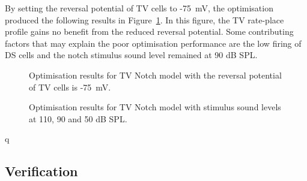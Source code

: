 By setting the reversal potential of TV cells to -75~mV, the optimisation
produced the following results in Figure~\ref{fig:TV_resultErev75}. In this
figure, the TV rate-place profile gains no benefit from the reduced reversal
potential.  Some contributing factors that may explain the poor optimisation
performance are the low firing of DS cells and the notch stimulus sound level
remained at 90 dB SPL.
\begin{figure}[h!]
  \centering
  \caption{Optimisation results for TV Notch model with the reversal potential
    of TV cells is -75~mV.  }
  \label{fig:TV_resultErev75}
\end{figure}


\begin{figure}[h!]
  \centering
  \caption{Optimisation results for TV Notch model with stimulus sound levels at
    110, 90 and 50 dB SPL.}
  \label{fig:TV_result_spl}
\end{figure}
q



\subsection{Verification}



